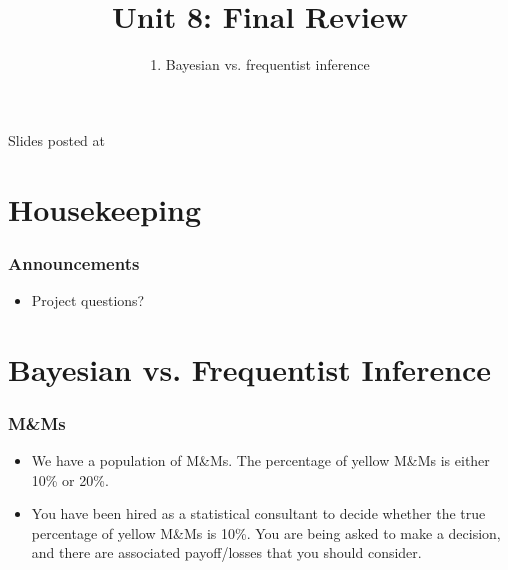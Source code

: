 \documentclass[11pt,containsverbatim,handout,xcolor=xelatex,dvipsnames,table]{beamer}
\title{Unit 8: Final Review}
\subtitle{1. Bayesian vs. frequentist inference}
\author{\CourseName}
\date{}
\institute{\InstituteName}
\begin{document}



\begin{frame}[plain]

\titlepage

\vfill

{\scriptsize {} \hfill Slides posted at  \webURL{\CourseSite}}

\addtocounter{framenumber}{-1} 

\end{frame}


\section{Housekeeping}


\begin{frame}
\frametitle{Announcements}

\begin{itemize}

\item Project questions?

\end{itemize}

\end{frame}


\section{Bayesian vs. Frequentist Inference}


\begin{frame}
\frametitle{M\&Ms}

\begin{itemize}

\item We have a population of M\&Ms. The percentage of yellow M\&Ms is either 10\% or 20\%.

\item You have been hired as a statistical consultant to decide whether the true percentage of yellow M\&Ms is 10\%. You are being asked to make a decision, and there are associated payoff/losses that you should consider.

\end{itemize}

\end{frame}
\end{document}
